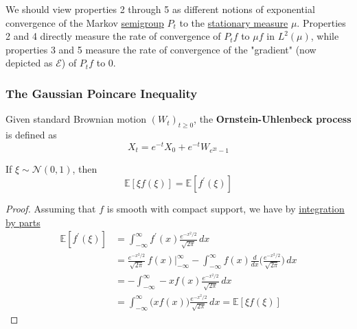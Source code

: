   We should view properties 2 through 5 as different notions of exponential convergence of the Markov \hyperref[alg-def:semigroup]{semigroup} $P_t$ to the \hyperref[def:stationary-measure]{stationary measure} $\mu$. Properties 2 and 4 directly measure the rate of convergence of $P_t f$ to $\mu f$ in $L^2 (\mu)$, while properties 3 and 5 measure the rate of convergence of the "gradient" (now depicted as $\mathcal{E}$) of $P_t f$ to $0$. 

\subsubsection{The Gaussian Poincare Inequality}

  \begin{definition}
    \label{def:ornstein-uhlenbeck-process}
  Given standard Brownian motion $(W_t)_{t \geq 0}$, the \textbf{Ornstein-Uhlenbeck process} is defined as 
  \begin{equation}
    X_t = e^{-t} X_0 + e^{-t} W_{e^{2t} - 1}
  \end{equation}
  \end{definition}

  \begin{lemma}
    \label{thm:gaussian-integration-by-parts}
  If $\xi \sim \mathcal{N}(0, 1)$, then 
  \begin{equation}
    \mathbb{E}[ \xi f(\xi)] = \mathbb{E}[f^\prime (\xi)]
  \end{equation}
  \end{lemma}
  \begin{proof}
  Assuming that $f$ is smooth with compact support, we have by \hyperref[real-thm:integration-by-parts]{integration by parts} 
  \begin{align*}
      \mathbb{E}[f^\prime (\xi)] & = \int_{-\infty}^\infty f^\prime(x) \frac{e^{-x^2 / 2}}{\sqrt{2\pi}} \,dx \\ 
      & = \frac{e^{-x^2 / 2}}{\sqrt{2\pi}} \, f(x) \bigg|_{-\infty}^\infty - \int_{-\infty}^\infty f(x) \frac{d}{dx} \bigg(\frac{e^{-x^2 / 2}}{\sqrt{2\pi}}\bigg) \,dx \\
      & = - \int_{-\infty}^\infty -x f(x) \frac{e^{-x^2 / 2}}{\sqrt{2\pi}} \,dx \\
      & = \int_{-\infty}^\infty \big( x f(x)\big) \frac{e^{-x^2 / 2}}{\sqrt{2\pi}}\,dx = \mathbb{E}[\xi f(\xi)]
  \end{align*}
  \end{proof}


